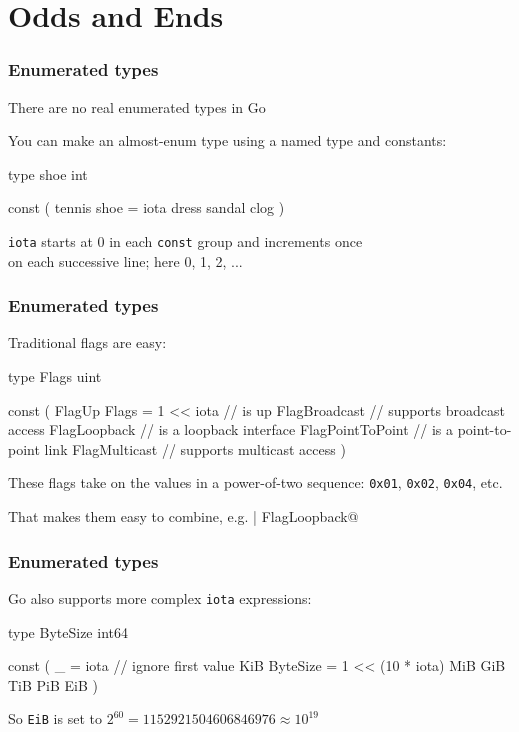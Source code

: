 \documentclass[handout,compress,t,11pt]{beamer}
\begin{document}
\section{Odds and Ends}
\begin{frame}[fragile]
    \frametitle{Enumerated types}
    There are no real enumerated types in Go \par
    \vspace{0.5\baselineskip}
    You can make an almost-enum type using a named type and constants:
\begin{golang}
    type shoe int

    const (
        tennis shoe = iota
        dress
        sandal
        clog
    )
\end{golang}
    \vspace{0.5\baselineskip}
    \verb|iota| starts at 0 in each \verb|const| group and increments once \\
    on each successive line; here 0, 1, 2, ...
\end{frame}

\begin{frame}[fragile]
    \frametitle{Enumerated types}
    Traditional flags are easy: \par
\begin{golang}
type Flags uint

const (
    FlagUp Flags = 1 << iota // is up
    FlagBroadcast            // supports broadcast access
    FlagLoopback             // is a loopback interface
    FlagPointToPoint         // is a point-to-point link
    FlagMulticast            // supports multicast access
)
\end{golang}
 \vspace{0.4\baselineskip}
These flags take on the values in a power-of-two sequence:
 \verb|0x01|, \verb|0x02|, \verb|0x04|, etc. \par
 \vspace{0.6\baselineskip}
That makes them easy to combine, e.g. \verb@FlagUp | FlagLoopback@ 
\end{frame}

\begin{frame}[fragile]
    \frametitle{Enumerated types}
    Go also supports more complex \verb|iota| expressions: \par
\begin{golang}
type ByteSize int64

const (
	_            = iota // ignore first value
	KiB ByteSize = 1 << (10 * iota)
	MiB
	GiB
	TiB
	PiB
	EiB
)
\end{golang}
\vspace{2\baselineskip}
So \verb|EiB| is set to $2^{60} = 1152921504606846976 \approx 10^{19}$
\end{frame}
\end{document}
